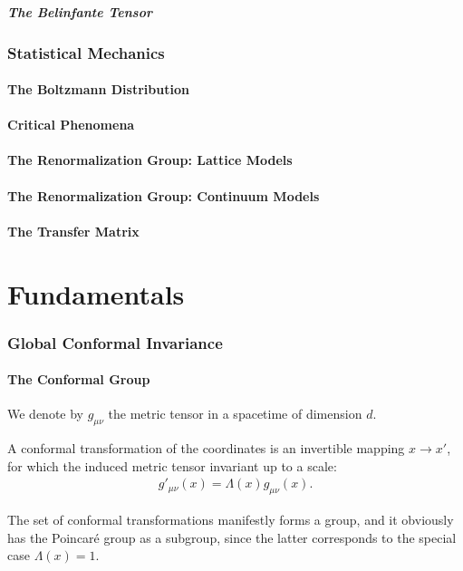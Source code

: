 \documentclass[10pt]{article}
\begin{document}
\subsubsection{The Belinfante Tensor}
\section{Statistical Mechanics}
\subsection{The Boltzmann Distribution}
\subsection{Critical Phenomena}
\subsection{The Renormalization Group: Lattice Models}
\subsection{The Renormalization Group: Continuum Models}
\subsection{The Transfer Matrix}

\part{Fundamentals}
\section{Global Conformal Invariance}
\subsection{The Conformal Group}
We denote by $g_{\mu\nu}$ the metric tensor in a spacetime of dimension $d$.
\begin{definition}
    A conformal transformation of the coordinates is an invertible mapping $x\to x'$, for which the induced metric tensor invariant up to a scale:
    \begin{align}
        g'_{\mu\nu}(x)=\Lambda(x)g_{\mu\nu}(x).
    \end{align}
\end{definition}
The set of conformal transformations manifestly forms a group, and it obviously has the Poincar\'{e} group as a subgroup, since the latter corresponds to the special case $\Lambda(x)=1$.
\end{document}
